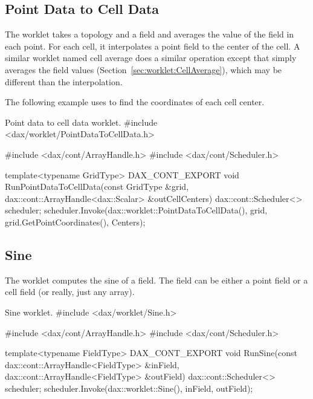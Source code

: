\subsection{Point Data to Cell Data}
\label{sec:worklet:PointDataToCellData}

The  worklet takes a topology and a field
and averages the value of the field in each point. For each cell, it
interpolates a point field to the center of the cell. A similar worklet
named cell average does a similar operation except that simply averages the
field values (Section~\ref{sec:worklet:CellAverage}), which may be
different than the interpolation.

The following example uses  to find the
coordinates of each cell center.

\begin{daxexample}{Point data to cell data worklet.}
#include <dax/worklet/PointDataToCellData.h>

#include <dax/cont/ArrayHandle.h>
#include <dax/cont/Scheduler.h>

template<typename GridType>
DAX_CONT_EXPORT
void RunPointDataToCellData(const GridType &grid,
                            dax::cont::ArrayHandle<dax::Scalar> &outCellCenters)
{
  dax::cont::Scheduler<> scheduler;
  scheduler.Invoke(dax::worklet::PointDataToCellData(),
                   grid,
                   grid.GetPointCoordinates(),
                   Centers);
}
\end{daxexample}

\subsection{Sine}

The  worklet computes the sine of a field. The field
can be either a point field or a cell field (or really, just any array).

\begin{daxexample}{Sine worklet.}
#include <dax/worklet/Sine.h>

#include <dax/cont/ArrayHandle.h>
#include <dax/cont/Scheduler.h>

template<typename FieldType>
DAX_CONT_EXPORT
void RunSine(const dax::cont::ArrayHandle<FieldType> &inField,
             dax::cont::ArrayHandle<FieldType> &outField)
{
  dax::cont::Scheduler<> scheduler;
  scheduler.Invoke(dax::worklet::Sine(), inField, outField);
}
\end{daxexample}

